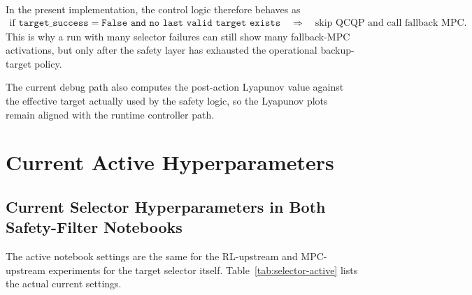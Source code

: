 \documentclass[11pt]{article}
\begin{document}
In the present implementation, the control logic therefore behaves as
\begin{align}
\text{if } \texttt{target\_success} = \texttt{False and no last valid target exists}
\quad \Longrightarrow \quad
\text{skip QCQP and call fallback MPC}.
\end{align}
This is why a run with many selector failures can still show many fallback-MPC activations, but only after the safety layer has exhausted the operational backup-target policy.

The current debug path also computes the post-action Lyapunov value against the effective target actually used by the safety logic, so the Lyapunov plots remain aligned with the runtime controller path.

\section{Current Active Hyperparameters}
\subsection{Current Selector Hyperparameters in Both Safety-Filter Notebooks}
The active notebook settings are the same for the RL-upstream and MPC-upstream experiments for the target selector itself. Table~\ref{tab:selector-active} lists the actual current settings.
\end{document}
